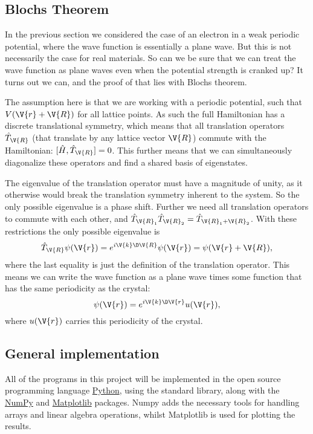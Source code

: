 \documentclass[main.tex]{subfiles}
\begin{document}
	
	
	\subsection{Blochs Theorem}
	In the previous section we considered the case of an electron in a weak periodic potential, where the wave function is essentially a plane wave. But this is not necessarily the case for real materials. So can we be sure that we can treat the wave function as plane waves even when the potential strength is cranked up? It turns out we can, and the proof of that lies with Blochs theorem.
	
	The assumption here is that we are working with a periodic potential, such that $ V(\V{r} + \V{R}) $ for all lattice points. As such the full Hamiltonian has a discrete translational symmetry, which means that all translation operators $ \hat{T}_{\V{R}} $ (that translate by any lattice vector $ \V{R} $) commute with the Hamiltonian: $ [\hat{H}, \hat{T}_{\V{R}}] = 0$. This further means that we can simultaneously diagonalize these operators and find a shared basis of eigenstates.
	
	The eigenvalue of the translation operator must have a magnitude of unity, as it otherwise would break the translation symmetry inherent to the system. So the only possible eigenvalue is a phase shift. Further we need all translation operators to commute with each other, and $ \hat{T}_{\V{R}_1} \hat{T}_{\V{R}_2} = \hat{T}_{\V{R}_1 + \V{R}_2} $. With these restrictions the only possible eigenvalue is
	\begin{equation}\label{key}
		\hat{T}_{\V{R}} \psi(\V{r}) = e^{i\V{k} \D\V{R}} \psi(\V{r}) = \psi(\V{r}+\V{R}),
	\end{equation}
	where the last equality is just the definition of the translation operator. This means we can write the wave function as a plane wave times some function that has the same periodicity as the crystal:
	\begin{equation}\label{key}
		\psi(\V{r}) = e^{i\V{k} \D \V{r}} u(\V{r}),
	\end{equation}
	where $ u(\V{r}) $ carries this periodicity of the crystal.
	
	
	
	\subsection{General implementation}
	All of the programs in this project will be implemented in the open source programming language \href{www.python.org}{Python}, using the standard library, along with the \href{www.numpy.org}{NumPy} and \href{www.matplotlib.org}{Matplotlib} packages. Numpy adds the necessary tools for handling arrays and linear algebra operations, whilst Matplotlib is used for plotting the results.
	
\end{document}
